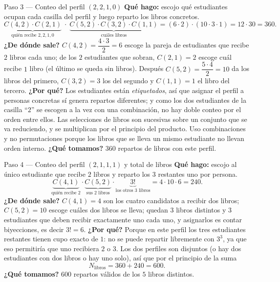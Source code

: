 \documentclass[11pt]{article}
\begin{document}
\begin{paso}{Paso 3 --- Conteo del perfil $(2,2,1,0)$}
\textbf{Qué hago:} escojo qué estudiantes ocupan cada casilla del perfil y luego reparto los libros concretos.
\[
\underbrace{C(4,2)\cdot C(2,1)}_{\text{quién recibe }2,2,1,0}\;\cdot\;\underbrace{C(5,2)\cdot C(3,2)\cdot C(1,1)}_{\text{cuáles libros}}
=(6\cdot 2)\cdot(10\cdot 3\cdot 1)=12\cdot 30=360 .
\]
\textbf{¿De dónde sale?} $C(4,2)=\dfrac{4\cdot3}{2}=6$ escoge la pareja de estudiantes que recibe $2$ libros cada uno; de los $2$ estudiantes que sobran, $C(2,1)=2$ escoge cuál recibe $1$ libro (el último se queda sin libros). Después $C(5,2)=\dfrac{5\cdot4}{2}=10$ da los libros del primero, $C(3,2)=3$ los del segundo y $C(1,1)=1$ el libro del tercero.
\textbf{¿Por qué?} Los estudiantes están \emph{etiquetados}, así que asignar el perfil a personas concretas sí genera repartos diferentes; y como los dos estudiantes de la casilla ``$2$'' se escogen a la vez con una combinación, no hay doble conteo por el orden entre ellos. Las selecciones de libros son sucesivas sobre un conjunto que se va reduciendo, y se multiplican por el principio del producto. Uso combinaciones y no permutaciones porque los libros que se lleva un mismo estudiante no llevan orden interno.
\textbf{¿Qué tomamos?} $360$ repartos de libros con este perfil.
\end{paso}

\begin{paso}{Paso 4 --- Conteo del perfil $(2,1,1,1)$ y total de libros}
\textbf{Qué hago:} escojo al único estudiante que recibe $2$ libros y reparto los $3$ restantes uno por persona.
\[
\underbrace{C(4,1)}_{\text{quién recibe }2}\cdot\underbrace{C(5,2)}_{\text{sus 2 libros}}\cdot\underbrace{3!}_{\text{los otros 3 libros}}=4\cdot 10\cdot 6=240 .
\]
\textbf{¿De dónde sale?} $C(4,1)=4$ son los cuatro candidatos a recibir dos libros; $C(5,2)=10$ escoge cuáles dos libros se lleva; quedan $3$ libros distintos y $3$ estudiantes que deben recibir exactamente uno cada uno, y asignarlos es contar biyecciones, es decir $3!=6$.
\textbf{¿Por qué?} Porque en este perfil los tres estudiantes restantes tienen cupo exacto de $1$: no se puede repartir libremente con $3^3$, ya que eso permitiría que uno recibiera $2$ o $3$. Los dos perfiles son disjuntos (o hay dos estudiantes con dos libros o hay uno solo), así que por el principio de la suma
\[
N_{\text{libros}}=360+240=600 .
\]
\textbf{¿Qué tomamos?} $600$ repartos válidos de los $5$ libros distintos.
\end{paso}
\end{document}
